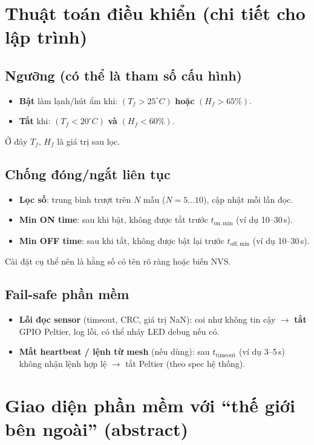 \documentclass[12pt,a4paper]{report}
\begin{document}
\section{Thuật toán điều khiển (chi tiết cho lập trình)}

\subsection{Ngưỡng (có thể là tham số cấu hình)}
\begin{itemize}
  \item \textbf{Bật} làm lạnh/hút ẩm khi: $(T_f > 25^\circ C)$ \textbf{hoặc} $(H_f > 65\%)$.
  \item \textbf{Tắt} khi: $(T_f < 20^\circ C)$ \textbf{và} $(H_f < 60\%)$.
\end{itemize}
Ở đây $T_f$, $H_f$ là giá trị sau lọc.

\subsection{Chống đóng/ngắt liên tục}
\begin{itemize}
  \item \textbf{Lọc số}: trung bình trượt trên $N$ mẫu ($N = 5\ldots 10$), cập nhật mỗi lần đọc.
  \item \textbf{Min ON time}: sau khi bật, không được tắt trước $t_{\mathrm{on,min}}$ (ví dụ 10--30\,s).
  \item \textbf{Min OFF time}: sau khi tắt, không được bật lại trước $t_{\mathrm{off,min}}$ (ví dụ 10--30\,s).
\end{itemize}
Cài đặt cụ thể nên là hằng số có tên rõ ràng hoặc biến NVS.

\subsection{Fail-safe phần mềm}
\begin{itemize}
  \item \textbf{Lỗi đọc sensor} (timeout, CRC, giá trị NaN): coi như không tin cậy $\rightarrow$ \textbf{tắt} GPIO Peltier, log lỗi, có thể nháy LED debug nếu có.
  \item \textbf{Mất heartbeat / lệnh từ mesh} (nếu dùng): sau $t_{\mathrm{timeout}}$ (ví dụ 3--5\,s) không nhận lệnh hợp lệ $\rightarrow$ tắt Peltier (theo spec hệ thống).
\end{itemize}

\section{Giao diện phần mềm với ``thế giới bên ngoài'' (abstract)}
\end{document}
